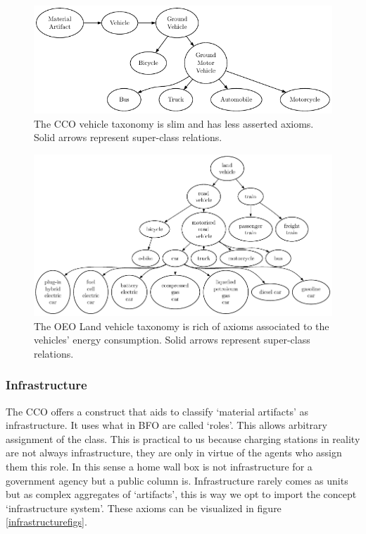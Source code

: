 \begin{figure}[h]
    \centering
    \includegraphics{images/CCOVehicles.pdf}
    \caption{The CCO vehicle taxonomy is slim and has less asserted axioms. Solid arrows represent super-class relations.}
    \label{ccovectax}
\end{figure}
\begin{figure}[h]
    
    \centering
    \includegraphics{images/OEOLVehicles.pdf}
    \caption{The OEO Land vehicle taxonomy is rich of axioms associated to the vehicles' energy consumption. Solid arrows represent super-class relations.}
    \label{landvehicletaxoeo}
\end{figure}

\subsubsection{Infrastructure}

The CCO offers a construct that aids to classify `material artifacts' as
infrastructure. It uses what in BFO are called `roles'. This allows arbitrary
assignment of the class. This is practical to us because charging stations in
reality are not always infrastructure, they are only in virtue of the agents
who assign them this role. In this sense a home wall box is not infrastructure
for a government agency but a public column is. Infrastructure rarely comes as
units but as  complex aggregates of `artifacts', this is way we opt to import
the concept `infrastructure system'. These axioms can be visualized in figure
\ref{infrastructurefigs}.

